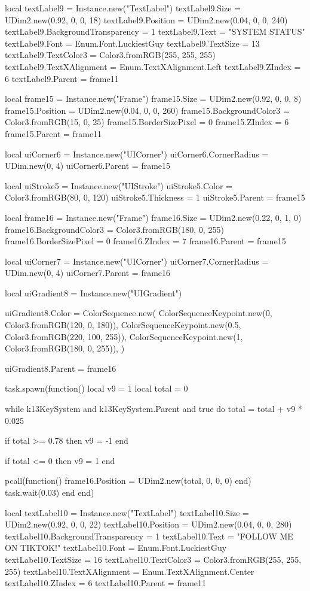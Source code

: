   local textLabel9 = Instance.new("TextLabel")
  textLabel9.Size = UDim2.new(0.92, 0, 0, 18)
  textLabel9.Position = UDim2.new(0.04, 0, 0, 240)
  textLabel9.BackgroundTransparency = 1
  textLabel9.Text = "SYSTEM STATUS"
  textLabel9.Font = Enum.Font.LuckiestGuy
  textLabel9.TextSize = 13
  textLabel9.TextColor3 = Color3.fromRGB(255, 255, 255)
  textLabel9.TextXAlignment = Enum.TextXAlignment.Left
  textLabel9.ZIndex = 6
  textLabel9.Parent = frame11

  local frame15 = Instance.new("Frame")
  frame15.Size = UDim2.new(0.92, 0, 0, 8)
  frame15.Position = UDim2.new(0.04, 0, 0, 260)
  frame15.BackgroundColor3 = Color3.fromRGB(15, 0, 25)
  frame15.BorderSizePixel = 0
  frame15.ZIndex = 6
  frame15.Parent = frame11

  local uiCorner6 = Instance.new("UICorner")
  uiCorner6.CornerRadius = UDim.new(0, 4)
  uiCorner6.Parent = frame15

  local uiStroke5 = Instance.new("UIStroke")
  uiStroke5.Color = Color3.fromRGB(80, 0, 120)
  uiStroke5.Thickness = 1
  uiStroke5.Parent = frame15

  local frame16 = Instance.new("Frame")
  frame16.Size = UDim2.new(0.22, 0, 1, 0)
  frame16.BackgroundColor3 = Color3.fromRGB(180, 0, 255)
  frame16.BorderSizePixel = 0
  frame16.ZIndex = 7
  frame16.Parent = frame15

  local uiCorner7 = Instance.new("UICorner")
  uiCorner7.CornerRadius = UDim.new(0, 4)
  uiCorner7.Parent = frame16

  local uiGradient8 = Instance.new("UIGradient")

  uiGradient8.Color = ColorSequence.new({
    ColorSequenceKeypoint.new(0, Color3.fromRGB(120, 0, 180)),
    ColorSequenceKeypoint.new(0.5, Color3.fromRGB(220, 100, 255)),
    ColorSequenceKeypoint.new(1, Color3.fromRGB(180, 0, 255)),
  })

  uiGradient8.Parent = frame16

  task.spawn(function()
    local v9 = 1
    local total = 0

    while k13KeySystem and k13KeySystem.Parent and true do
      total = total + v9 * 0.025

      if total >= 0.78 then
        v9 = -1
      end

      if total <= 0 then
        v9 = 1
      end

      pcall(function() frame16.Position = UDim2.new(total, 0, 0, 0) end)
      task.wait(0.03)
    end
  end)

  local textLabel10 = Instance.new("TextLabel")
  textLabel10.Size = UDim2.new(0.92, 0, 0, 22)
  textLabel10.Position = UDim2.new(0.04, 0, 0, 280)
  textLabel10.BackgroundTransparency = 1
  textLabel10.Text = "FOLLOW ME ON TIKTOK!"
  textLabel10.Font = Enum.Font.LuckiestGuy
  textLabel10.TextSize = 16
  textLabel10.TextColor3 = Color3.fromRGB(255, 255, 255)
  textLabel10.TextXAlignment = Enum.TextXAlignment.Center
  textLabel10.ZIndex = 6
  textLabel10.Parent = frame11

